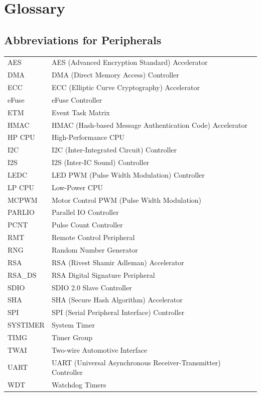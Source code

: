 \section*{Glossary}\label{glossary}
\rhead{\Navigation}

\subsection*{Abbreviations for Peripherals}

\begin{longtable}[c]{ R{3cm} p{12cm} }

AES     & AES (Advanced Encryption Standard) Accelerator \\
DMA     & DMA (Direct Memory Access) Controller \\
ECC     & ECC (Elliptic Curve Cryptography) Accelerator  \\ 
eFuse   & eFuse Controller \\ 
ETM     & Event Task Matrix \\ 
HMAC    & HMAC (Hash-based Message Authentication Code) Accelerator \\ 
HP CPU  & High-Performance CPU \\ 
I2C     & I2C (Inter-Integrated Circuit) Controller \\
I2S     & I2S (Inter-IC Sound) Controller \\ 
LEDC    & LED PWM (Pulse Width Modulation) Controller \\ 
LP CPU  & Low-Power CPU \\ 
MCPWM   & Motor Control PWM (Pulse Width Modulation) \\ 
PARLIO  & Parallel IO Controller \\ 
PCNT & Pulse Count Controller \\
RMT     & Remote Control Peripheral \\
RNG     & Random Number Generator \\
RSA     & RSA (Rivest Shamir Adleman) Accelerator \\
RSA\_DS & RSA Digital Signature Peripheral \\
SDIO    & SDIO 2.0 Slave Controller \\ 
SHA     & SHA (Secure Hash Algorithm) Accelerator \\
SPI     & SPI (Serial Peripheral Interface) Controller \\
SYSTIMER & System Timer \\
TIMG    & Timer Group \\
TWAI    & Two-wire Automotive Interface \\ 
UART    & UART (Universal Asynchronous Receiver-Transmitter) Controller \\ 
WDT & Watchdog Timers \\ 

\end{longtable}




